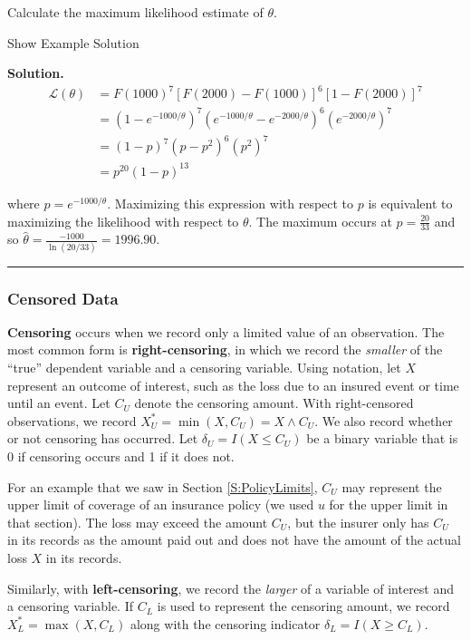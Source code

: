 \documentclass[]{book}
\theoremstyle{definition}
\theoremstyle{definition}
\theoremstyle{definition}
\theoremstyle{remark}
\begin{document}
Calculate the maximum likelihood estimate of \(\theta\).

Show Example Solution

\hypertarget{toggleExampleSelect.3.1}{}
\textbf{Solution.} \[
\begin{aligned}
\mathcal{L}(\theta) &= F(1000)^7[F(2000)-F(1000)]^6[1-F(2000)]^7 \\
&= (1-e^{-1000/\theta})^7(e^{-1000/\theta} - e^{-2000/\theta})^6(e^{-2000/\theta})^7 \\
&= (1-p)^7(p-p^2)^6(p^2)^7 \\
&= p^{20}(1-p)^{13}
\end{aligned}
\]

where \(p=e^{-1000/\theta}\). Maximizing this expression with respect to
\(p\) is equivalent to maximizing the likelihood with respect to
\(\theta\). The maximum occurs at \(p=\frac{20}{33}\) and so
\(\hat{\theta}=\frac{-1000}{\ln(20/33)}= 1996.90\).

\begin{center}\rule{0.5\linewidth}{\linethickness}\end{center}

\subsubsection{Censored Data}\label{censored-data}

\textbf{Censoring} occurs when we record only a limited value of an
observation. The most common form is \textbf{right-censoring}, in which
we record the \emph{smaller} of the ``true'' dependent variable and a
censoring variable. Using notation, let \(X\) represent an outcome of
interest, such as the loss due to an insured event or time until an
event. Let \(C_U\) denote the censoring amount. With right-censored
observations, we record \(X_U^{\ast}= \min(X, C_U) = X \wedge C_U\). We
also record whether or not censoring has occurred. Let
\(\delta_U= I(X \leq C_U)\) be a binary variable that is 0 if censoring
occurs and 1 if it does not.

For an example that we saw in Section \ref{S:PolicyLimits}, \(C_U\) may
represent the upper limit of coverage of an insurance policy (we used
\(u\) for the upper limit in that section). The loss may exceed the
amount \(C_U\), but the insurer only has \(C_U\) in its records as the
amount paid out and does not have the amount of the actual loss \(X\) in
its records.

Similarly, with \textbf{left-censoring}, we record the \emph{larger} of
a variable of interest and a censoring variable. If \(C_L\) is used to
represent the censoring amount, we record \(X_L^{\ast}= \max(X, C_L)\)
along with the censoring indicator \(\delta_L= I(X \geq C_L)\).
\end{document}
